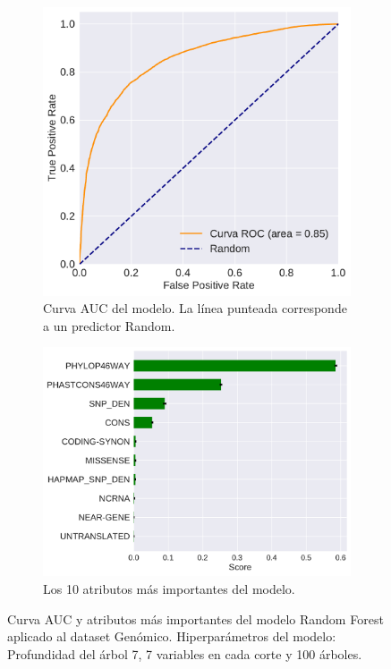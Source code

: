 \newpage

\begin{figure}[H]
\centering
\begin{subfigure}[b]{0.7\textwidth}
    \centering
    \includegraphics[width=\textwidth]{documents/latex/figures/3/genomic/auc_genomic.pdf}
    \caption{Curva AUC del modelo. La línea punteada corresponde a un predictor Random.}
    \label{fig:auc_genomic}
\end{subfigure}

\hfill
\hfill

\begin{subfigure}[b]{0.7\textwidth}
    \centering
    \includegraphics[width=\textwidth]{documents/latex/figures/3/genomic/importances_genomic.pdf}
    \caption{Los 10 atributos más importantes del modelo.}
    \label{fig:importances_genomic}
\end{subfigure}

\caption{Curva AUC y atributos más importantes del modelo Random Forest aplicado al dataset Genómico. Hiperparámetros del modelo: Profundidad del árbol 7, 7 variables en cada corte y 100 árboles.}

\end{figure}
